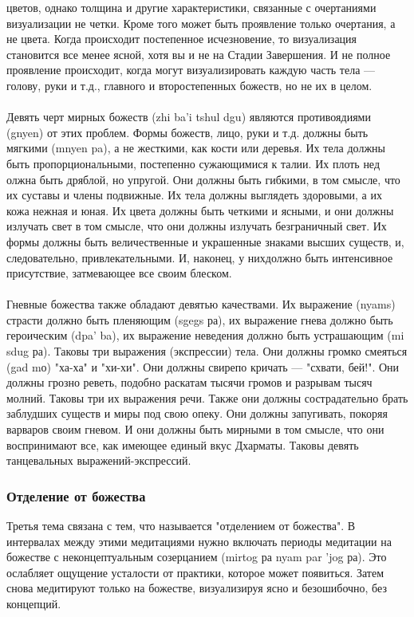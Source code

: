 \begin{siderules}
цветов, однако толщина и другие характеристики, связанные с очертаниями визуализации не
четки. Кроме того может быть проявление только очертания, а не цвета. Когда происходит
постепенное исчезновение, то визуализация становится все менее ясной, хотя вы и не на
Стадии Завершения. И не полное проявление происходит, когда могут визуализировать
каждую часть тела — голову, руки и т.д., главного и второстепенных божеств, но не их в
целом.\\
\\
Девять черт мирных божеств (zhi ba'i tshul dgu) являются противоядиями (gnyen) от этих
проблем. Формы божеств, лицо, руки и т.д. должны быть мягкими (mnyen pa), а не жесткими,
как кости или деревья. Их тела должны быть пропорциональными, постепенно сужающимися
к талии. Их плоть нед олжна быть дряблой, но упругой. Они должны быть гибкими, в том
смысле, что их суставы и члены подвижные. Их тела должны выглядеть здоровыми, а их
кожа нежная и юная. Их цвета должны быть четкими и ясными, и они должны излучать свет
в том смысле, что они должны излучать безграничный свет. Их формы должны быть
величественные и украшенные знаками высших существ, и, следовательно,
привлекательными. И, наконец, у нихдолжно быть интенсивное присутствие, затмевающее
все своим блеском.\\
\\
Гневные божества также обладают девятью качествами. Их выражение (nyams) страсти
должно быть пленяющим (sgegs ра), их выражение гнева должно быть героическим (dpa' ba),
их выражение неведения должно быть устрашающим (mi sdug ра). Таковы три выражения
(экспрессии) тела. Они должны громко смеяться (gad mо) "ха-ха" и "хи-хи". Они должны
свирепо кричать — "схвати, бей!". Они должны грозно реветь, подобно раскатам тысячи
громов и разрывам тысяч молний. Таковы три их выражения речи. Также они должны
сострадательно брать заблудших существ и миры под свою опеку. Они должны запугивать,
покоряя варваров своим гневом. И они должны быть мирными в том смысле, что они
воспринимают все, как имеющее единый вкус Дхарматы. Таковы девять танцевальных
выражений-экспрессий.
\end{siderules}

\subsubsection{Отделение от божества}

Третья тема связана с тем, что называется "отделением от божества". В интервалах
между этими медитациями нужно включать периоды медитации на божестве с
неконцептуальным созерцанием (mirtog ра nyam par 'jog ра). Это ослабляет ощущение
усталости от практики, которое может появиться. Затем снова медитируют только на
божестве, визуализируя ясно и безошибочно, без концепций.

